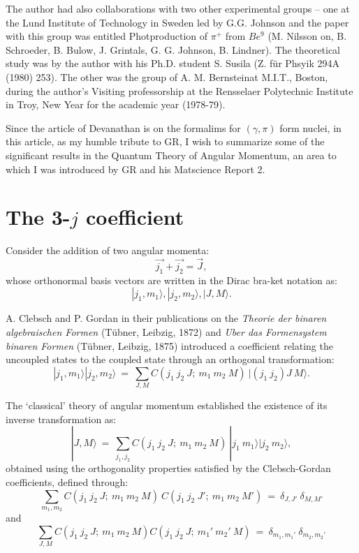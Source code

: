 The author had also collaborations with two other experimental groups -- one at 
the Lund Institute of Technology in Sweden led by G.G. Johnson and the paper with 
this group was  entitled Photproduction of $\pi^+$ from $Be^9$ (M. Nilsson on, 
B. Schroeder, B. Bulow, J. Grintals, G. G. Johnson, B. Lindner). The theoretical 
study was by the author with his Ph.D. student S. Susila (Z. für Phsyik 294A 
(1980) 253). The other was the group of A. M. Bernsteinat M.I.T., Boston, during the 
author's Visiting professorship at the Rensselaer Polytechnic Institute in Troy,
New Year for the academic year (1978-79).

Since the article of Devanathan is on the formalims for $(\gamma,\pi)$ form 
nuclei, in this article, as my humble tribute to GR, I wish to summarize some of 
the significant results in the Quantum Theory of Angular Momentum, an area to 
which I was introduced by GR and his Matscience Report 2.

\section*{The 3-$j$ coefficient}

Consider the addition of two angular momenta:
\makeatletter
{}
\makeatother
\begin{equation}
\vec{j_1} + \vec{j_2} = \vec{J}, \label{chap29-eq1} 
\end{equation}
whose orthonormal basis vectors are written in the Dirac bra-ket notation as:
\begin{equation} 
|j_1,m_1\rangle , |j_2,m_2\rangle, |J,M\rangle. \label{chap29-eq2}
\end{equation}

A. Clebsch and P. Gordan in their publications on the \textit{Theorie der binaren 
algebraischen Formen} (Tübner, Leibzig, 1872) and \textit{Uber das Formensystem 
binaren Formen} (Tübner, Leibzig, 1875) introduced a coefficient relating the 
uncoupled states to the coupled state through an orthogonal transformation:
\begin{equation}
|j_1,m_1\rangle|j_2,m_2\rangle\ =\ \sum_{J,M} C(j_1\ j_2\ J;\ m_1\ m_2\ M)\ |(j_1\ j_2)J\ M\rangle. \label{chap29-eq3}
\end{equation}

The `classical' theory of angular momentum established the existence of its inverse 
transformation as:
\begin{equation}
|J,M\rangle\ =\ \sum_{j_1,j_2} C(j_1\ j_2\ J;\ m_1\ m_2\ M)\ |j_1\ m_1\rangle |j _2\  m_2\rangle, \label{chap29-eq4}
\end{equation}
obtained using the orthogonality properties satisfied by the Clebsch-Gordan coefficients, defined through:
\begin{equation}
\sum_{m_1,m_2} C(j_1\ j_2\ J;\ m_1\ m_2\ M)\ C(j_1\ j_2\ J';\ m_1\ m_2\ M')\ =\ \delta_{J,J'}\ \delta_{M,M'} \label{chap29-eq5}
\end{equation}
and
\begin{equation}
\sum_{J,M} C(j_1\ j_2\ J;\ m_1\ m_2\ M)C(j_1\ j_2\ J;\ m_1'\ m_2'\ M)\ =\ \delta_{m_1,m_1'} \ \delta_{m_2,m_2'} \label{chap29-eq6}
\end{equation}

